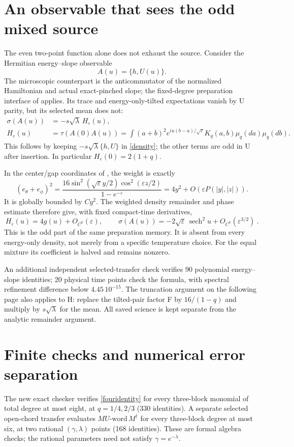 \documentclass[11pt]{article}
\newcommand{\eps}{\varepsilon}
\newcommand{\sech}{\operatorname{sech}}
\newcommand{\tr}{\tau}
\begin{document}
\newpage
\section{An observable that sees the odd mixed source}
The even two-point function alone does not exhaust the source.
Consider the Hermitian energy--slope observable
\[
 A(u)=\{h,U(u)\}.
\]
The microscopic counterpart is the anticommutator of the
normalized Hamiltonian and actual exact-pinched slope; the
fixed-degree preparation interface of \cite{actual} applies.
Its trace and energy-only-tilted expectations vanish by U parity,
but its selected mean does not:
\begin{align}
 \sigma(A(u))&=-s\sqrt\lambda\,H_\eps(u),\label{odd}\\
 H_\eps(u)&=\tr(A(0)A(u))
 =\int(a+b)^2e^{iu(b-a)/\sqrt\eps}
               K_q(a,b)\mu_q(da)\mu_q(db).\nonumber
\end{align}
This follows by keeping $-s\sqrt\lambda\{h,U\}$ in
\eqref{density}; the other terms are odd in U after insertion.
In particular $H_\eps(0)=2(1+q)$.

In the center/gap coordinates of \cite{weighted}, the weight is
exactly
\[
 (e_\theta+e_\phi)^2=
 \frac{16\sin^2(\sqrt\eps y/2)\cos^2(\eps z/2)}
      {1-e^{-\eps}}
 =4y^2+O(\eps P(|y|,|z|)).
\]
It is globally bounded by $Cy^2$. The weighted density remainder
and phase estimate therefore give, with fixed compact-time
derivatives,
\[
 H_\eps(u)=4g(u)+O_{C^k}(\eps),\qquad
 \boxed{\ \sigma(A(u))=-2\sqrt\eps\,\sech^2u
                         +O_{C^k}(\eps^{3/2})\ }.
\]
This is the odd part of the same preparation memory. It is absent
from every energy-only density, not merely from a specific
temperature choice. For the equal mixture its coefficient is
halved and remains nonzero.

An additional independent selected-transfer check verifies 90
polynomial energy--slope identities; 20 physical time points
check the formula, with spectral refinement difference below
$4.45\,10^{-15}$. The truncation argument on the following page
also applies to H: replace the tilted-pair factor F by
$16/(1-q)$ and multiply by $s\sqrt\lambda$ for the mean.
All saved science is kept separate from the analytic remainder
argument.

\newpage
\section{Finite checks and numerical error separation}
The new exact checker verifies \eqref{fouridentity} for every
three-block monomial of total degree at most eight, at
$q=1/4,2/3$ (330 identities). A separate selected open-chord
transfer evaluates $M U\text{-word}\,M^\dagger$ for every
three-block degree at most six, at two rational $(\gamma,\lambda)$
points (168 identities). These are formal algebra checks; the
rational parameters need not satisfy $\gamma=e^{-\lambda}$.
\end{document}
